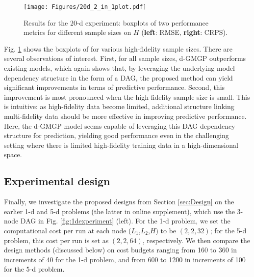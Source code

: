 \documentclass[12pt]{article}
\newcommand{\cbl}[1]{{\color{black}{#1}}}
\begin{document}
\begin{figure}[!t]
    \centering
    \texttt{[image: Figures/20d\_2\_in\_1plot.pdf]}
  \caption{Results for the 20-d experiment: boxplots of two performance metrics for different sample sizes on $H$ (\textbf{left}: RMSE, \textbf{right}: CRPS).}
  \label{fig:PerformanceComparison}
\end{figure}

Fig. \ref{fig:PerformanceComparison} shows the boxplots of \cbl{RMSE and CRPS (N-RMSE results are in the online supplement)} for various high-fidelity sample sizes. There are several observations of interest. First, for all sample sizes, d-GMGP outperforms existing models, which again shows that, by leveraging the underlying model dependency structure in the form of a DAG, the proposed method can yield significant improvements in terms of predictive performance. Second, this improvement is most pronounced when the high-fidelity sample size is small. This is intuitive: as high-fidelity data become limited, additional structure linking multi-fidelity data should be more effective in improving predictive performance. Here, the d-GMGP model seems capable of leveraging this DAG dependency structure for prediction, yielding good performance even in the challenging setting where there is limited high-fidelity training data in a high-dimensional space. 


\subsection{Experimental design}
\label{subsec:expdesign}

Finally, we investigate the proposed designs from Section \ref{sec:Design} on the earlier 1-d and 5-d problems (the latter in online supplement), which use the 3-node DAG in Fig. \ref{fig:1dexperiment} (left). For the 1-d problem, we set the computational cost per run at each node ($L_1$,$L_2$,$H$) to be $(2,2,32)$; for the 5-d problem, this cost per run is set as $(2,2,64)$, respectively. We then compare the design methods (discussed below) on cost budgets ranging from 160 to 360 in increments of 40 for the 1-d problem, and from 600 to 1200 in increments of 100 for the 5-d problem.
\end{document}
